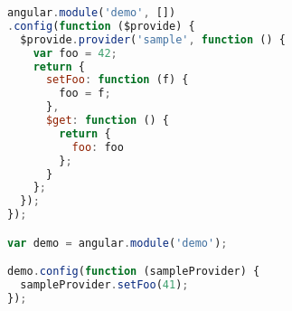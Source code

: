 \begin{lstlisting}[language=JavaScript]
angular.module('demo', [])
.config(function ($provide) {
  $provide.provider('sample', function () {
    var foo = 42;
    return {
      setFoo: function (f) {
        foo = f;
      },
      $get: function () {
        return {
          foo: foo
        };
      }
    };
  });
});

var demo = angular.module('demo');

demo.config(function (sampleProvider) {
  sampleProvider.setFoo(41);
});
\end{lstlisting}

\clearpage